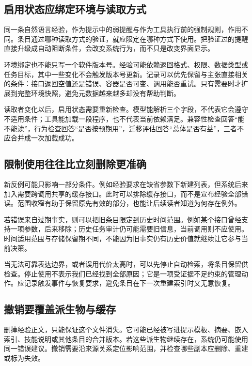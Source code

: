\subsection{启用状态应绑定环境与读取方式}

同一条自然语言经验，作为提示中的弱提醒与作为工具执行前的强制规则，作用不同。条目通过哪种读取方式的验证，就应限定在哪种方式下使用。把验证过的提醒直接升级成自动阻断条件，会改变系统行为，而不只是改变界面显示。

环境绑定也不能只写一个软件版本号。经验可能依赖返回格式、权限、数据类型或任务目标，其中一些变化不会触发版本号更新。记录可以优先保留与主张直接相关的条件：接口返回空值还是错误、容器是否可变、调用能否重试。只有需要时才扩展到完整环境快照，避免元数据越来越多却没有帮助判断。

读取者变化以后，启用状态需要重新检查。模型能解析三个字段，不代表它会遵守不适用条件；工具能加载一段程序，也不代表当前依赖满足。兼容性检查回答“能不能读”，行为检查回答“是否按预期用”，迁移评估回答“总体是否有益”，三者不应合并成一次加载成功。

\subsection{限制使用往往比立刻删除更准确}

新反例可能只影响一部分条件。例如经验要求在缺省参数下新建列表，但系统后来加入需要跨调用共享的缓存接口。此时可以排除缓存接口，而不是宣布经验全部错误。范围收窄有助于保留原先有效的部分，也能让后续读者知道为何存在例外。

若错误来自过期事实，则可以把旧条目限定到历史时间范围。例如某个接口曾经支持一项参数，后来移除；历史任务审计仍可能需要旧信息，当前调用则不应使用。时间适用范围与存储保留期不同，不能因为旧事实仍有历史价值就继续让它参与当前决策。

当无法可靠表达边界，或者误用代价太高时，可以先停止自动检索，将条目保留供检查。停止使用不表示我们已经找到全部原因；它是一项受证据不足约束的管理动作。应记录触发事件与恢复要求，避免条目在下一次重建索引时又无意恢复。

\subsection{撤销要覆盖派生物与缓存}

删掉经验正文，只能保证这个文件消失。它可能已经被写进提示模板、摘要、嵌入索引、技能说明或其他条目的合并版本。若这些派生物继续存在，系统仍可能使用同一错误建议。撤销需要沿来源关系定位影响范围，并检查哪些副本应删除、重建或标为失效。

